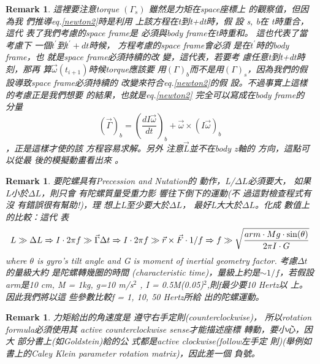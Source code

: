 \documentclass[12pt]{article}
\newtheorem{remark}[theorem]{Remark}
\begin{document}
\begin{remark}
這裡要注意torque $\left( \Gamma _{s}\right) $%
雖然是力矩在space座標上%
的觀察值，但因為我%
們推導eq.\ref{newton2}時是利用%
上該方程在t到t+dt時，假%
設 s, b在 t時重合，這代%
表了我們考慮的space frame是%
必須與body frame在t時重和。%
這也代表了當考慮下%
一個$t^{\prime }$到$t^{\prime }+dt$時候，%
方程考慮的space frame會必須%
是在$t^{\prime }$時的body frame，也%
就是space frame必須持續的改%
變，這代表，若要考%
慮任意t到t+dt時刻，那再%
算$\vec{\omega}(t_{i+1})$時候torque應該要%
用$\left( \Gamma \right) _{b}$而不是用$\left(
\Gamma \right) _{s}$，因為我們的假%
設導致space frame必須持續的%
改變來符合eq.\ref{newton2}的假%
設。不過事實上這樣%
的考慮正是我們想要%
的結果，也就是eq.\ref{newton2}%
完全可以寫成在body frame的%
分量%
\begin{equation}
\left( \vec{\Gamma}\right) _{b}=\left( \frac{dI\vec{\omega}}{dt}\right) _{b}+%
\vec{\omega}\times \left( I\vec{\omega}\right) _{b}
\end{equation}%
，正是這樣才使的該%
方程容易求解。另外%
注意$\vec{L}$並不在body z軸的%
方向，這點可以從最%
後的模擬動畫看出來%
。
\end{remark}

\begin{remark}
要陀螺具有Precession and Nutation的%
動作，L/$\Delta L$必須要大，%
如果L小於$\Delta L$，則只會%
有陀螺質量受重力影%
響往下倒下的運動(不%
過這對檢查程式有沒%
有錯誤很有幫助!)，理%
想上L至少要大於$\Delta L$，%
最好L大大於$\Delta L$。化成%
數值上的比較：這代%
表%
\begin{equation}
L\gg \Delta L\Rightarrow I\cdot 2\pi f\gg \vec{\Gamma}\Delta t\Rightarrow
I\cdot 2\pi f\gg \vec{r}\times \vec{F}\cdot 1/f\Rightarrow f\gg \sqrt{\frac{%
arm\cdot Mg\cdot \sin (\theta )}{2\pi I\cdot G}}
\end{equation}%
where $\theta $ is gyro's tilt angle and G is moment of inertial geometry
factor. 考慮$\Delta t$的量級大約%
是陀螺轉幾圈的時間%
(characteristic time)，量級上約是$\sim
1/f$，若假設arm是10 cm, M = 1kg, g=10 m/s$^{2}$%
, I = 0.5M(0.05)$^{2}$,則f最少要10 Hertz以%
上。因此我們將以這%
些參數比較f = 1, 10, 50 Hertz所給%
出的陀螺運動。
\end{remark}

\begin{remark}
力矩給出的角速度是%
遵守右手定則(counterclockwise)，%
所以rotation formula必須使用其%
active counterclockwise sense才能描述座標%
轉動，要小心，因大%
部分書上(如Goldstein)給的公%
式都是active clockwise(follow左手定%
則)(舉例如書上的Caley Klein
parameter rotation matrix)，因此差一個%
負號。\bigskip
\end{remark}
\end{document}
